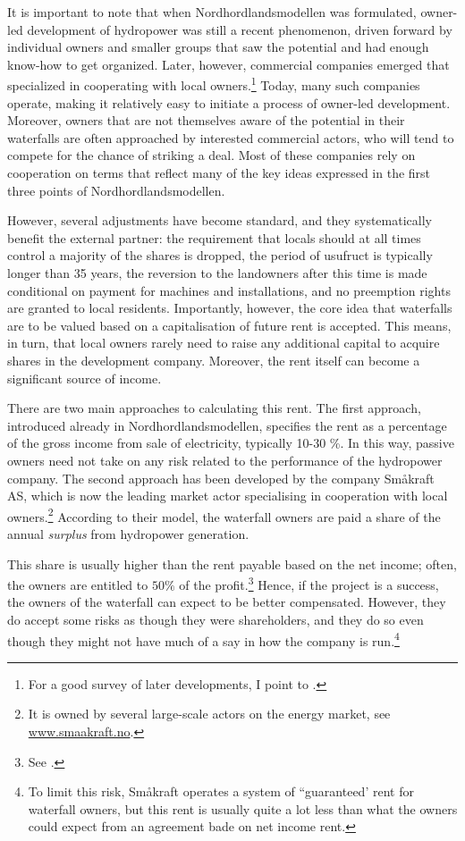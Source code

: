 It is important to note that when Nordhordlandsmodellen was formulated, owner-led development of hydropower was still a recent phenomenon, driven forward by individual owners and smaller groups that saw the potential and had enough know-how to get organized. Later, however, commercial companies emerged that specialized in cooperating with local owners.\footnote{For a good survey of later developments, I point to \cite{larsen06,larsen08,larsen12}.} Today, many such companies operate, making it relatively easy to initiate a process of owner-led development. Moreover, owners that are not themselves aware of the potential in their waterfalls are often approached by interested commercial actors, who will tend to compete for the chance of striking a deal. Most of these companies rely on cooperation on terms that reflect many of the key ideas expressed in the first three points of Nordhordlandsmodellen.

However, several adjustments have become standard, and they systematically benefit the external partner: the requirement that locals should at all times control a majority of the shares is dropped, the period of usufruct is typically longer than 35 years, the reversion to the landowners after this time is made conditional on payment for machines and installations, and no preemption rights are granted to local residents. Importantly, however, the core idea that waterfalls are to be valued based on a capitalisation of future rent is accepted. This means, in turn, that local owners rarely need to raise any additional capital to acquire shares in the development company. Moreover, the rent itself can become a significant source of income. 

There are two main approaches to calculating this rent. The first approach, introduced already in Nordhordlandsmodellen, specifies the rent as a percentage of the gross income from sale of electricity, typically 10-30 \%. In this way, passive owners need not take on any risk related to the performance of the hydropower company. The second approach has been developed by the company Småkraft AS, which is now the leading market actor specialising in cooperation with local owners.\footnote{It is owned by several large-scale actors on the energy market, see \url{www.smaakraft.no}.} According to their model, the waterfall owners are paid a share of the annual {\it surplus} from hydropower generation.

This share is usually higher than the rent payable based on the net income; often, the owners are entitled to $50 \%$ of the profit.\footnote{See \cite{aanesland09}.} Hence, if the project is a success, the owners of the waterfall can expect to be better compensated. However, they do accept some risks as though they were shareholders, and they do so even though they might not have much of a say in how the company is run.\footnote{To limit this risk, Småkraft operates a system of ``guaranteed' rent for waterfall owners, but this rent is usually quite a lot less than what the owners could expect from an agreement bade on net income rent.}

